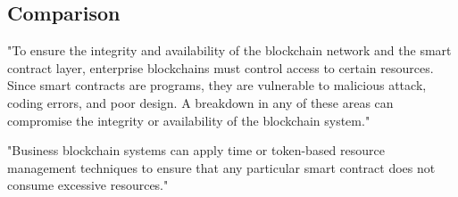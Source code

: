 

\subsection{Comparison}

"To ensure the integrity and availability of the blockchain network and the smart contract layer, enterprise blockchains must control access to certain resources.
Since smart contracts are programs, they are vulnerable to malicious attack, coding errors, and poor design.
A breakdown in any of these areas can compromise the integrity or availability of the blockchain system."~\cite{hyper2}

"Business blockchain systems can apply time or token-based resource management techniques to ensure that any particular smart contract does not consume excessive resources."~\cite{hyper2}










